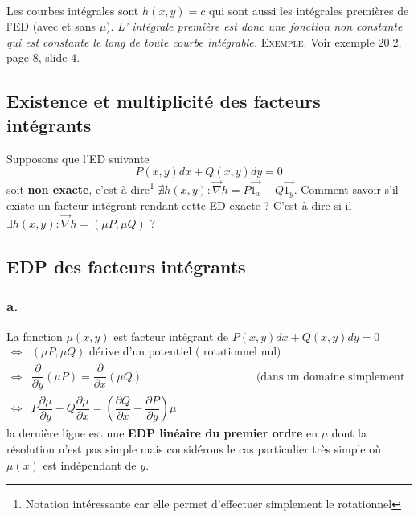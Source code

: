 	\
		
	Les courbes intégrales sont $h(x,y) = c$ qui sont aussi les 
	intégrales premières de l'ED (avec et sans $\mu$). \textit{L'
	intégrale première est donc une fonction non constante qui est 
	constante le long de toute courbe intégrable.} 
	\textsc{Exemple.} Voir exemple 20.2, page 8, slide 4.
	
	\subsection{Existence et multiplicité des facteurs intégrants}
	Supposons que l'ED suivante 
	\begin{equation}
	P(x,y)dx + Q(x,y)dy = 0
	\end{equation}
	soit \textbf{non exacte}, c'est-à-dire\footnote{Notation intéressante 
	car elle permet d'effectuer simplement le rotationnel} $\nexists h(x,y) : 
	\vec \nabla h = P\vec{1_x}+Q\vec{1_y}$. Comment savoir s'il existe 
	un facteur intégrant  rendant cette ED exacte ? C'est-à-dire si il 
	$\exists h(x,y) : \vec\nabla h = (\mu P,\mu Q)$ ?
	
	\subsection{EDP des facteurs intégrants}	
	\subsubsection{a.}
	La fonction $\mu(x,y)$ est facteur intégrant de $P(x,y)dx+Q(x,y)dy = 0$
	\begin{equation}
	\begin{array}{lll}
	\Leftrightarrow &(\mu P, \mu Q) \text{ dérive d'un potentiel (
	rotationnel nul)}\\
	\Leftrightarrow & \dfrac{\partial}{\partial y}	(\mu P) = \dfrac{
	\partial}{\partial x}(\mu Q) & \text{(dans un domaine simplement 
	connexe)}\\
	\Leftrightarrow & P\dfrac{\partial\mu}{\partial y}-Q\dfrac{\partial\mu}{
	\partial x} = \left(\dfrac{\partial Q}{\partial x}-\dfrac{\partial P}{
	\partial y}\right)\mu
	\end{array}
	\end{equation}
	la dernière ligne est une \textbf{EDP linéaire du premier ordre} en 
	$\mu$ dont la résolution n'est pas simple mais considérons le cas 
	particulier très simple où $\mu(x)$ est indépendant de $y$.\\
	

